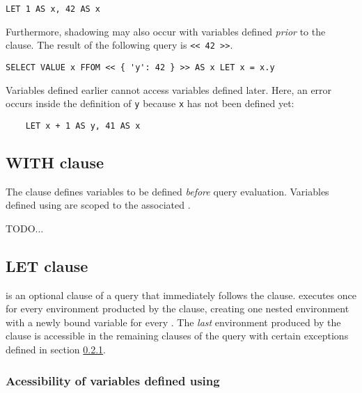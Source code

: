 \begin{lstlisting}
LET 1 AS x, 42 AS x 
\end{lstlisting}

\noindent Furthermore, shadowing may also occur with variables defined
\emph{prior} to the  clause.  The result of the
following query is \lstinline{<< 42 >>}.

\begin{lstlisting}
SELECT VALUE x FFOM << { 'y': 42 } >> AS x LET x = x.y
\end{lstlisting} 

\noindent Variables defined earlier  cannot access variables defined
later.  Here, an error occurs inside the definition of \lstinline{y} because
\lstinline{x} has not been defined yet:

\begin{lstlisting}
    LET x + 1 AS y, 41 AS x 
\end{lstlisting}

\subsection{WITH clause}

The  clause defines variables to be defined \emph{before} query
evaluation. Variables defined using  are scoped to the associated
.

\bigskip

TODO...

\subsection{LET clause} 
\label{sec:let-clause}

 is an optional clause of a  query that immediately follows
the  clause.  executes once for every environment producted by
the  clause, creating one nested environment with a newly bound
variable for every . The \emph{last} environment produced by the
 clause is accessible in the remaining clauses of the  query
with certain exceptions defined in section
\ref*{sec:let-variable-accessibility}.

\subsubsection{Acessibility of variables defined using }
\label{sec:let-variable-accessibility}

